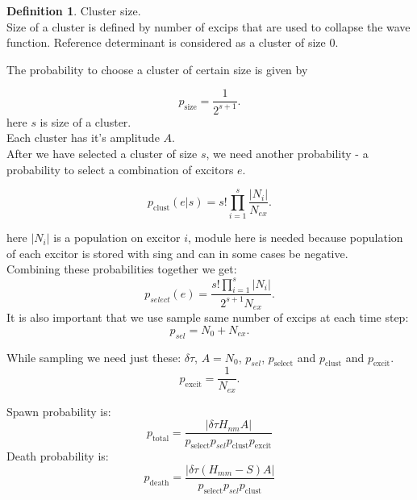 \documentclass[twoside,english]{uiofysmaster}
\theoremstyle{definition}
\newtheorem{defn}{Definition}
\begin{document}
\begin{defn}Cluster size.\\
 Size of a cluster is defined by number of excips that are used to collapse the wave function. Reference determinant is considered as a cluster of size $0$.
\end{defn}
The probability to choose a cluster of certain size is given by

\begin{equation}
	p_{\text{size}} = \frac{1}{2^{s+1}}.
\end{equation}
here $s$ is size of a cluster. \\
Each cluster has it's amplitude $A$.\\
After we have selected a cluster of size $s$, we need another probability - a probability to select a combination of excitors $e$.

\begin{equation}
p_{\text{clust}} (e|s)= s! \prod_{i=1}^s \frac{|N_i|}{N_{ex}}.
\end{equation}

here $|N_i|$ is a population on excitor $i$, module here is needed because population of each excitor is stored with sing and can in some cases be negative.\\
Combining these probabilities together we get:
\begin{equation}
p_{select}(e)= \frac{s!\prod_{i=1}^{s} |N_i|}{2^{s+1}N_{ex}}.
\end{equation}
It is also important that we use sample same number of excips at each time step:
\begin{equation}
p_{sel}= N_0+N_{ex}.
\end{equation}

While sampling we need just these: $\delta \tau$, $A=N_0$, $p_{sel}$, $p_{\text{select}}$ and $p_{\text{clust}}$ and $p_{\text{excit}}$.
\begin{equation}
p_{\text{excit}} = \frac{1}{N_{ex}}. 
\end{equation}

Spawn probability is:
\begin{equation}
p_{\text{total}} = \frac{|\delta \tau H_{nm}A|}{p_{\text{select}}p_{sel}p_{\text{clust}}p_{\text{excit}}} 
\end{equation} 
Death probability is: 
\begin{equation}
p_{\text{death}} = \frac{|\delta \tau (H_{mm} - S)A|}{p_{\text{select}}p_{sel}p_{\text{clust}}} 
\end{equation}
\end{document}
